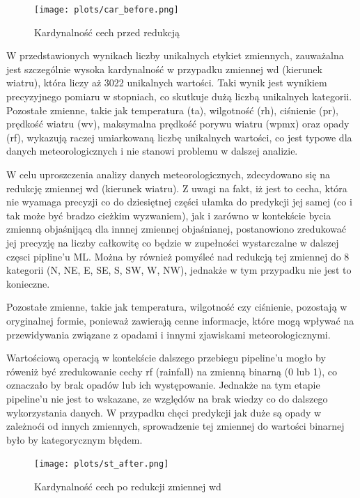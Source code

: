 \documentclass[10pt,a4paper]{article}
\begin{document}
\begin{figure}[h]
	\centering
	\texttt{[image: plots/car\_before.png]}
	\caption{Kardynalność cech przed redukcją}
	\label{fig:my_label}
\end{figure}
\noindent W przedstawionych wynikach liczby unikalnych etykiet zmiennych, zauważalna jest szczególnie wysoka kardynalność w przypadku zmiennej wd (kierunek wiatru), która liczy aż 3022 unikalnych wartości. Taki wynik jest wynikiem precyzyjnego pomiaru w stopniach, co skutkuje dużą liczbą unikalnych kategorii. Pozostałe zmienne, takie jak temperatura (ta), wilgotność (rh), ciśnienie (pr), prędkość wiatru (wv), maksymalna prędkość porywu wiatru (wpmx) oraz opady (rf), wykazują raczej umiarkowaną liczbę unikalnych wartości, co jest typowe dla danych meteorologicznych i nie stanowi problemu w dalszej analizie.
\par
\hspace{0.75cm}
W celu uproszczenia analizy danych meteorologicznych, zdecydowano się na redukcję zmiennej wd (kierunek wiatru). Z uwagi na fakt, iż jest to cecha, która nie wyamaga precyzji co do dziesiętnej części ułamka do predykcji jej samej (co i tak może być bradzo cieżkim wyzwaniem), jak i zarówno w kontekście bycia zmienną objaśnijącą dla innnej zmiennej objaśnianej, postanowiono zredukować jej precyzję na liczby całkowitę co będzie w zupełności wystarczalne w dalszej częsci pipline'u ML.
Można by również pomyśleć nad redukcją tej zmiennej do 8 kategorii (N, NE, E, SE, S, SW, W, NW), jednakże w tym przypadku nie jest to konieczne.
\par
\hspace{0.75cm}
Pozostałe zmienne, takie jak temperatura, wilgotność czy ciśnienie, pozostają w oryginalnej formie, ponieważ zawierają cenne informacje, które mogą wpływać na przewidywania związane z opadami i innymi zjawiskami meteorologicznymi.
\par
\hspace{0.75cm}
Wartościową operacją w kontekście dalszego przebiegu pipeline'u mogło by róweniż być zredukowanie cechy rf (rainfall) na zmienną binarną (0 lub 1), co oznaczało by brak opadów lub ich występowanie. Jednakże na tym etapie pipeline'u nie jest to wskazane, ze względów na brak wiedzy co do dalszego wykorzystania danych. W przypadku chęci predykcji jak duże są opady w zależnoći od innych zmiennych, sprowadzenie tej zmiennej do wartości binarnej było by kategorycznym błędem.
\begin{figure}[h]
	\centering
	\texttt{[image: plots/st\_after.png]}
	\caption{Kardynalność cech po redukcji zmiennej wd}
	\label{fig:my_label}
\end{figure}
\end{document}
